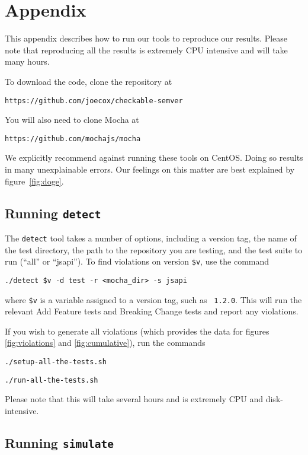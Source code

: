 \section{Appendix}
This appendix describes how to run our tools to reproduce our
results. Please note that reproducing all the results is extremely CPU
intensive and will take many hours.

To download the code, clone the repository at
\begin{center}
  {\tt https://github.com/joecox/checkable-semver}
\end{center}

You will also need to clone Mocha at
\begin{center}
  {\tt https://github.com/mochajs/mocha}
\end{center}

We explicitly recommend against running these tools on CentOS. Doing so
results in many unexplainable errors. Our feelings on this matter are
best explained by figure~\ref{fig:doge}.

\subsection{Running {\large {\tt detect}}}

The {\tt detect} tool takes a number of options, including a version
tag, the name of the test directory, the path to the repository you
are testing, and the test suite to run (``all'' or ``jsapi''). To find
violations on version {\tt \$v}, use the command

\begin{center}
  {\tt ./detect \$v -d test -r <mocha\_dir> -s jsapi}
\end{center}
where {\tt \$v} is a variable assigned to a version tag, such as {\tt
  1.2.0}. This will run the relevant Add Feature tests and Breaking
Change tests and report any violations.

If you wish to generate all violations (which provides the data for
figures \ref{fig:violations} and \ref{fig:cumulative}), run the
commands

\begin{center}
  {\tt ./setup-all-the-tests.sh}
\end{center}
\begin{center}
  {\tt ./run-all-the-tests.sh}
\end{center}
Please note that this will take several hours and is extremely CPU
and disk-intensive.

\subsection{Running {\large {\tt simulate}}}

